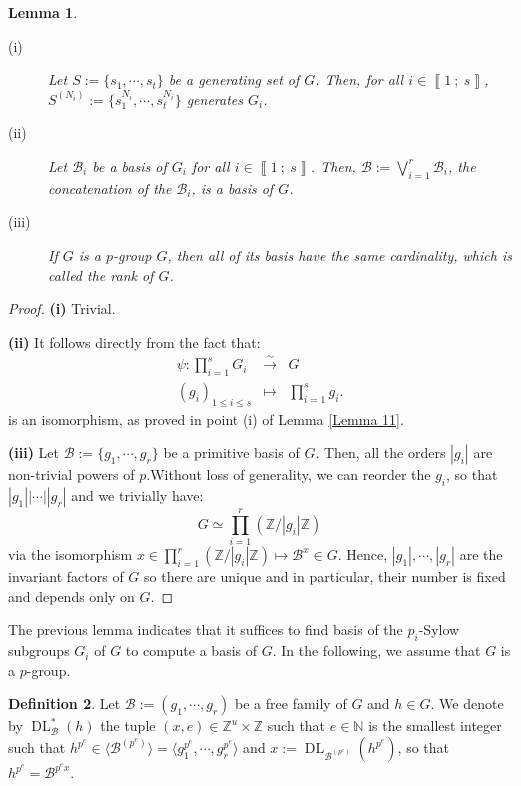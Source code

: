 \documentclass[a4paper,10pt,notitlepage]{report}
\theoremstyle{definition}
\newtheorem{Definition}{Definition}[chapter]
\theoremstyle{plain}
\newtheorem{Lemma}[Definition]{Lemma}
\theoremstyle{definition}
\newcommand{\N}{\mathbb{N}}
\newcommand{\Z}{\mathbb{Z}}
\newcommand{\m}[1]{\mathcal{#1}}
\renewcommand{\i}[2]{\left\llbracket #1~;~#2\right\rrbracket}
\renewcommand{\(}{\left(}
\renewcommand{\)}{\right)}
\DeclareMathOperator{\DL}{DL}
\begin{document}
\begin{Lemma}\label{Lemma 12}
\begin{description}
\item[(i)] Let $S:=\{s_1,\cdots, s_t\}$ be a generating set of $G$.  Then, for all $i\in\i{1}{s}$, $S^{(N_i)}:=\{s_1^{N_i},\cdots, s_t^{N_i}\}$ generates $G_i$.

\item[(ii)] Let $\m{B}_i$ be a basis of $G_i$ for all $i\in\i{1}{s}$. Then, $\m{B}:=\bigvee_{i=1}^r\m{B}_i$, the concatenation of the $\m{B}_i$, is a basis of $G$.

\item[(iii)] If $G$ is a $p$-group $G$, then all of its basis have the same cardinality, which is called the \emph{rank} of $G$.
\end{description}
\end{Lemma}

\begin{proof}
\textbf{(i)} Trivial.

\textbf{(ii)} It follows directly from the fact that:
\[\begin{array}{rcl}
\psi : \prod_{i=1}^s G_i &\overset{\sim}{\longrightarrow}& G\\
(g_i)_{1\leq i\leq s} &\longmapsto & \prod_{i=1}^s g_i.
\end{array}\]
is an isomorphism, as proved in point (i) of Lemma \ref{Lemma 11}.

\textbf{(iii)} Let $\m{B}:=\{g_1,\cdots, g_r\}$ be a primitive basis of $G$. Then, all the orders $|g_i|$ are non-trivial powers of $p$.Without loss of generality, we can reorder the $g_i$, so that $|g_1||\cdots||g_r|$ and we trivially have:
\[G\simeq \prod_{i=1}^r (\Z/|g_i|\Z)\]
via the isomorphism $x\in\prod_{i=1}^r (\Z/|g_i|\Z)\longmapsto\m{B}^x\in G$.  Hence, $|g_1|,\cdots,|g_r|$ are the invariant factors of $G$ so there are unique and in particular, their number is fixed and depends only on $G$.
\end{proof}

The previous lemma indicates that it suffices to find basis of the $p_i$-Sylow subgroups $G_i$ of $G$ to compute a basis of $G$. In the following, we assume that $G$ is a $p$-group.

\begin{Definition}
Let $\m{B}:=(g_1,\cdots, g_r)$ be a free family of $G$ and $h\in G$. We denote by $\DL_{\m{B}}^*(h)$ the tuple $(x,e)\in\Z^u\times\Z$ such that $e\in\N$ is the smallest integer such that $h^{p^e}\in\langle\m{B}^{(p^e)}\rangle=\langle g_1^{p^e},\cdots, g_r^{p^e}\rangle$ and $x:=\DL_{\m{B}^{(p^e)}}(h^{p^e})$, so that $h^{p^e}=\m{B}^{p^e x}$. 
\end{Definition}
\end{document}

